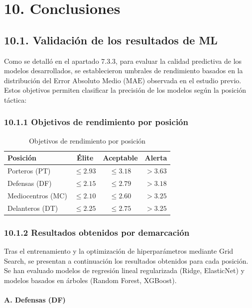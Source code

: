 \section*{10. Conclusiones}
\subsection{10.1. Validación de los resultados de ML}

Como se detalló en el apartado 7.3.3, para evaluar la calidad 
predictiva de los modelos desarrollados, se establecieron umbrales 
de rendimiento basados en la distribución del Error Absoluto Medio 
($\mathrm{MAE}$) observada en el estudio previo. Estos objetivos 
permiten clasificar la precisión de los modelos según la posición 
táctica:


\subsubsection{10.1.1 Objetivos de rendimiento por posición}

\begin{table}[H]
\centering
\small
\begin{tabular}{|l|c|c|c|}
\hline
\textbf{Posición} & \textbf{Élite} & \textbf{Aceptable} & 
\textbf{Alerta} \\
\hline
Porteros (PT) & $\le 2.93$ & $\le 3.18$ & 
$> 3.63$ \\
Defensas (DF) & $\le 2.15$ & $\le 2.79$ & 
$> 3.18$ \\
Mediocentros (MC) & $\le 2.10$ & $\le 2.60$ & 
$> 3.25$ \\
Delanteros (DT) & $\le 2.25$ & $\le 2.75$ & 
$> 3.25$ \\
\hline
\end{tabular}
\caption{Objetivos de rendimiento por posición}
\end{table}


\subsubsection{10.1.2 Resultados obtenidos por demarcación}

Tras el entrenamiento y la optimización de hiperparámetros mediante 
Grid Search, se presentan a continuación los resultados obtenidos 
para cada posición. Se han evaluado modelos de regresión lineal 
regularizada (Ridge, ElasticNet) y modelos basados en árboles 
(Random Forest, XGBoost).


\paragraph{A. Defensas (DF)}


